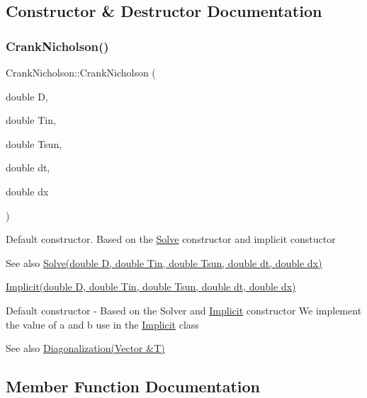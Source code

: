 \subsection{Constructor \& Destructor Documentation}
\mbox{\label{class_crank_nicholson_a77c284d244c4c0aabcd2b7d35efc356e}} 
\subsubsection{\texorpdfstring{Crank\+Nicholson()}{CrankNicholson()}}
{\footnotesize\ttfamily Crank\+Nicholson\+::\+Crank\+Nicholson (\begin{DoxyParamCaption}\item[{double}]{D,  }\item[{double}]{Tin,  }\item[{double}]{Tsun,  }\item[{double}]{dt,  }\item[{double}]{dx }\end{DoxyParamCaption})}

Default constructor. Based on the \hyperlink{class_solve}{Solve} constructor and implicit constuctor \begin{DoxySeeAlso}{See also}
\hyperlink{class_solve_a1e0efad6dcf6b09759dd38df7aa08db8}{Solve(double D, double Tin, double Tsun, double dt, double dx)} 

\hyperlink{class_implicit_afe5ef51232ab8925009f584c679bdfce}{Implicit(double D, double Tin, double Tsun, double dt, double dx)}
\end{DoxySeeAlso}
Default constructor -\/ Based on the Solver and \hyperlink{class_implicit}{Implicit} constructor We implement the value of a and b use in the \hyperlink{class_implicit}{Implicit} class \begin{DoxySeeAlso}{See also}
\hyperlink{class_implicit_a572fff2232977c83c432f993f37a7853}{Diagonalization(\+Vector \&\+T)} 
\end{DoxySeeAlso}


\subsection{Member Function Documentation}
\mbox{\label{class_crank_nicholson_a999d04c6ef97b0794f66584f9192dbee}} 
